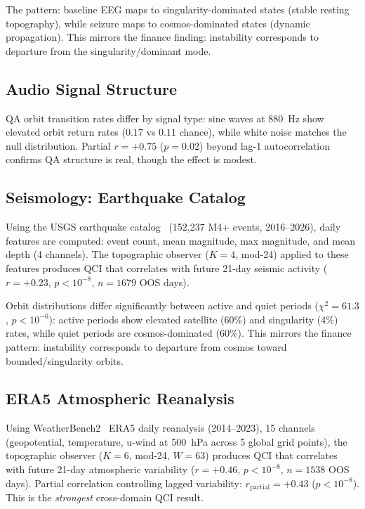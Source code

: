 \documentclass[11pt,a4paper]{article}
\begin{document}
The pattern: baseline EEG maps to singularity-dominated states (stable
resting topography), while seizure maps to cosmos-dominated states
(dynamic propagation). This mirrors the finance finding: instability
corresponds to departure from the singularity/dominant mode.

\subsection{Audio Signal Structure}

QA orbit transition rates differ by signal type: sine waves at 880~Hz
show elevated orbit return rates ($0.17$ vs $0.11$ chance), while white
noise matches the null distribution. Partial $r = +0.75$ ($p = 0.02$)
beyond lag-1 autocorrelation confirms QA structure is real, though the
effect is modest.

\subsection{Seismology: Earthquake Catalog}

Using the USGS earthquake catalog~\cite{usgs} (152,237 M4+ events, 2016--2026),
daily features are computed: event count, mean magnitude, max magnitude,
and mean depth (4 channels). The topographic observer ($K=4$, mod-24)
applied to these features produces QCI that correlates with future
21-day seismic activity ($r = +0.23$, $p < 10^{-8}$, $n = 1679$ OOS days).

Orbit distributions differ significantly between active and quiet periods
($\chi^2 = 61.3$, $p < 10^{-6}$):
active periods show elevated satellite (60\%) and singularity (4\%)
rates, while quiet periods are cosmos-dominated (60\%).
This mirrors the finance pattern: instability corresponds to departure
from cosmos toward bounded/singularity orbits.

\subsection{ERA5 Atmospheric Reanalysis}

Using WeatherBench2~\cite{weatherbench2} ERA5 daily reanalysis (2014--2023), 15 channels
(geopotential, temperature, u-wind at 500~hPa across 5 global grid points),
the topographic observer ($K=6$, mod-24, $W=63$) produces QCI that
correlates with future 21-day atmospheric variability
($r = +0.46$, $p < 10^{-8}$, $n = 1538$ OOS days).
Partial correlation controlling lagged variability:
$r_{\text{partial}} = +0.43$ ($p < 10^{-8}$).
This is the \emph{strongest} cross-domain QCI result.
\end{document}
